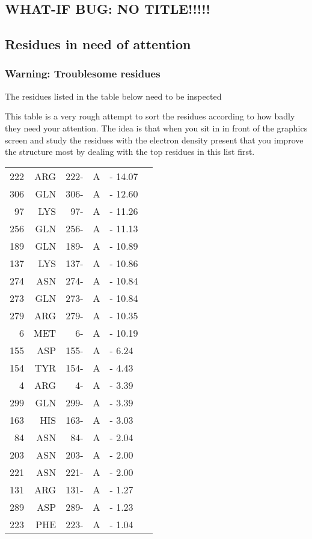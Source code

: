\documentclass[a4paper]{article}
\def\showsect#1{
  \thesect\gdef\thesect{}
  \thessect\gdef\thessect{}
  \subsubsection{#1}
}
\def\ssect#1{
  \gdef\thessect{\subsection{#1}}
}
\gdef\thesect{\pagebreak[2]\section{WHAT-IF BUG: NO TITLE!!!!!}}
\gdef\thessect{\subsection{General}}
\begin{document}
\ssect{Residues in need of attention}
\begin{warning}
\showsect{Warning: Troublesome residues}
The residues listed in the table below need to be inspected
 
This table is a very rough attempt to sort the residues according to how
badly they need your attention. The idea is that when you sit in  in front
of the graphics screen and study the residues with the electron density
present that you improve the structure most by dealing with the top residues
in this list first.
 
\begin{center}
 
\begin{supertabular}{rr@{ (}r@{) }rl@{ }r}
  222&ARG & 222-&A &-     14.07\\
  306&GLN & 306-&A &-     12.60\\
   97&LYS &  97-&A &-     11.26\\
  256&GLN & 256-&A &-     11.13\\
  189&GLN & 189-&A &-     10.89\\
  137&LYS & 137-&A &-     10.86\\
  274&ASN & 274-&A &-     10.84\\
  273&GLN & 273-&A &-     10.84\\
  279&ARG & 279-&A &-     10.35\\
    6&MET &   6-&A &-     10.19\\
  155&ASP & 155-&A &-      6.24\\
  154&TYR & 154-&A &-      4.43\\
    4&ARG &   4-&A &-      3.39\\
  299&GLN & 299-&A &-      3.39\\
  163&HIS & 163-&A &-      3.03\\
   84&ASN &  84-&A &-      2.04\\
  203&ASN & 203-&A &-      2.00\\
  221&ASN & 221-&A &-      2.00\\
  131&ARG & 131-&A &-      1.27\\
  289&ASP & 289-&A &-      1.23\\
  223&PHE & 223-&A &-      1.04\\
\end{supertabular}\end{center}
\end{warning}
\end{document}
